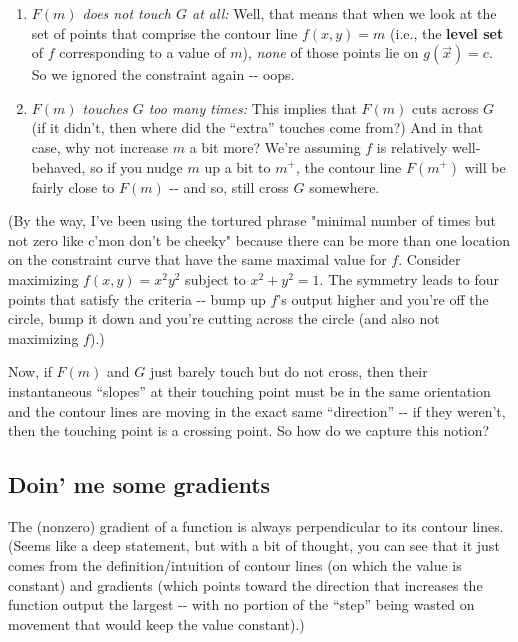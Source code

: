 \documentclass[letterpaper,12pt]{report}
\providecommand{\tightlist}{%
  \setlength{\itemsep}{0pt}\setlength{\parskip}{0pt}}
\begin{document}
\begin{enumerate}
\tightlist
\item
  \emph{\(F(m)\) does not touch \(G\) at all:} Well, that means that
  when we look at the set of points that comprise the contour line
  \(f(x,y) = m\) (i.e., the \textbf{level set} 
   of \(f\) corresponding to
  a value of \(m\)), \emph{none} of those points lie on
  \(g(\vec{x}) = c\). So we ignored the constraint again -\/- oops.
\item
  \emph{\(F(m)\) touches \(G\) too many times:} This implies that
  \(F(m)\) cuts across \(G\) (if it didn't, then where did the ``extra''
  touches come from?) And in that case, why not increase \(m\) a bit
  more? We're assuming \(f\) is relatively well-behaved, so if you nudge
  \(m\) up a bit to \(m^+\), the contour line \(F(m^+)\) will be fairly
  close to \(F(m)\) -\/- and so, still cross \(G\) somewhere.
\end{enumerate}

(By the way, I've been using the tortured phrase "minimal number of
times but not zero like c'mon don't be cheeky" because there can be more
than one location on the constraint curve that have the same maximal
value for \(f\). Consider maximizing \(f(x,y) = x^2 y^2\) subject to
\(x^2 + y^2 = 1\). The symmetry leads to four points that satisfy the
criteria -\/- bump up \(f\)'s output higher and you're off the circle,
bump it down and you're cutting across the circle (and also not
maximizing \(f\)).)

Now, if \(F(m)\) and \(G\) just barely touch but do not cross, then
their instantaneous ``slopes'' at their touching point must be in the same
orientation and the contour lines are moving in the exact same
``direction'' -\/- if they weren't, then the touching point is a crossing
point. So how do we capture this notion?

\subsection{Doin' me some gradients}\label{doin-me-some-gradients}

The (nonzero) gradient of a function is always perpendicular to its
contour lines. (Seems like a deep statement, but with a bit of thought,
you can see that it just comes from the definition/intuition of contour
lines (on which the value is constant) and gradients (which points
toward the direction that increases the function output the largest -\/-
with no portion of the ``step'' being wasted on movement that would keep
the value constant).)
\end{document}
